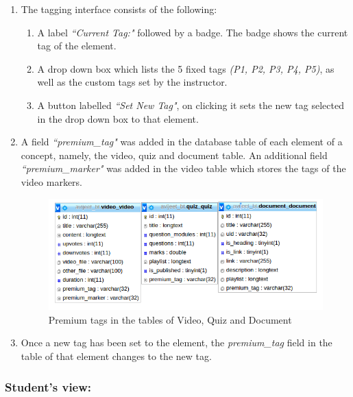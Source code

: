 \begin{enumerate}

	\item The tagging interface consists of the following:
	\begin{enumerate}
		\item A label \textit{``Current Tag:"} followed by a badge. The badge shows the current tag of the element.
		\item A drop down box which lists the 5 fixed tags \textit{(P1, P2, P3, P4, P5)}, as well as the custom tags set by the instructor.
		\item A button labelled \textit{``Set New Tag"}, on clicking it sets the new tag selected in the drop down box to that element.
	\end{enumerate}
	
	\item A field \textit{``premium\_tag"} was added in the database table of each element of a concept, namely, the video, quiz and document table. An additional field \textit{``premium\_marker"} was added in the video table which stores the tags of the video markers.
	
	\begin{figure}[h]
	\centering
	\includegraphics[width=0.9\linewidth]{./media/elementsSchema}
	\caption{Premium tags in the tables of Video, Quiz and Document}
	\label{fig:elementsSchema}
	\end{figure}

	\item Once a new tag has been set to the element, the \textit{premium\_tag} field in the table of that element changes to the new tag.
	
\end{enumerate}

\subsubsection*{Student's view:}


